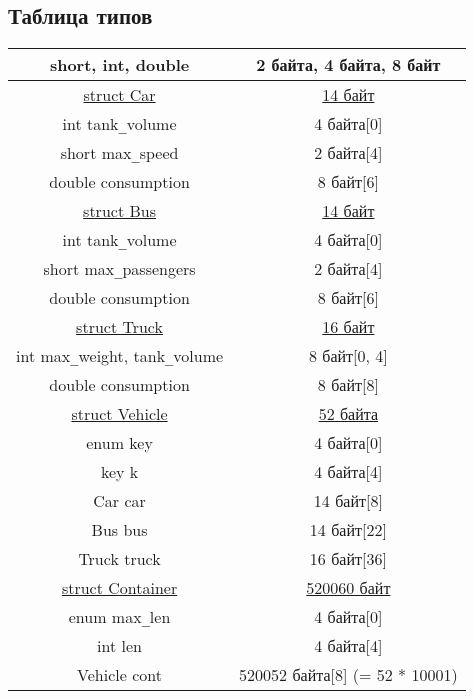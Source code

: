 \documentclass[a4paper]{article}
\begin{document}
\subsection*{Таблица типов}

\begin{tabular}{ |c|c| }
    \hline
    short, int, double & 2 байта, 4 байта, 8 байт \\
    \hline
    \underline{struct Car} & \underline{14 байт} \\
    int tank\verb|_|volume & 4 байта[0] \\
    short max\verb|_|speed & 2 байта[4]\\
    double consumption & 8 байт[6]\\
    \hline
    \underline{struct Bus} & \underline{14 байт} \\
    int tank\verb|_|volume & 4 байта[0] \\
    short max\verb|_|passengers & 2 байта[4]\\
    double consumption & 8 байт[6]\\
    \hline
    \underline{struct Truck} & \underline{16 байт} \\
    int max\verb|_|weight, tank\verb|_|volume & 8 байт[0, 4] \\
    double consumption & 8 байт[8]\\
    \hline
    \underline{struct Vehicle} & \underline{52 байта} \\
    enum key & 4 байта[0] \\
    key k & 4 байта[4] \\
    Car car & 14 байт[8]\\
    Bus bus & 14 байт[22]\\
    Truck truck & 16 байт[36]\\
    \hline
    \underline{struct Container} & \underline{520060 байт} \\
    enum max\verb|_|len & 4 байта[0] \\
    int len & 4 байта[4] \\
    Vehicle cont & 520052 байта[8] (= 52 * 10001)\\
    \hline
\end{tabular}
\end{document}
